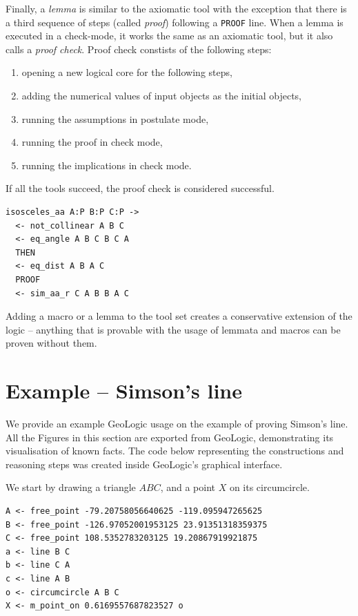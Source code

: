 \documentclass[runningheads]{llncs}
\begin{document}
Finally, a \emph{lemma} is similar to the axiomatic tool with the
exception that there is a third sequence of steps
(called \emph{proof}) following a \texttt{PROOF} line. When a lemma is
executed in a check-mode, it works the same as an axiomatic tool, but
it also calls a \emph{proof check}.
Proof check constists of the following steps:
\begin{enumerate}
\item opening a new logical core for the following steps,
\item adding the numerical values of input objects as the initial objects,
\item running the assumptions in postulate mode,
\item running the proof in check mode,
\item running the implications in check mode.
\end{enumerate}
If all the tools succeed, the proof check is considered successful.

\begin{verbatim}
isosceles_aa A:P B:P C:P -> 
  <- not_collinear A B C
  <- eq_angle A B C B C A
  THEN
  <- eq_dist A B A C
  PROOF
  <- sim_aa_r C A B B A C
\end{verbatim}

Adding a macro or a lemma to the tool set creates a conservative
extension of the logic -- anything that is provable with the usage of
lemmata and macros can be proven without them.

\section{Example -- Simson's line}

We provide an example GeoLogic usage on the example of proving Simson's line.
All the Figures in this section are exported from GeoLogic,
demonstrating its visualisation of known facts. The code below
representing the constructions and reasoning steps was created inside
GeoLogic's graphical interface.

We start by drawing a triangle $ABC$, and a point $X$ on its
circumcircle.
\begin{verbatim}
A <- free_point -79.20758056640625 -119.095947265625
B <- free_point -126.97052001953125 23.91351318359375
C <- free_point 108.5352783203125 19.20867919921875
a <- line B C
b <- line C A
c <- line A B
o <- circumcircle A B C
X <- m_point_on 0.6169557687823527 o
\end{verbatim}
\end{document}
